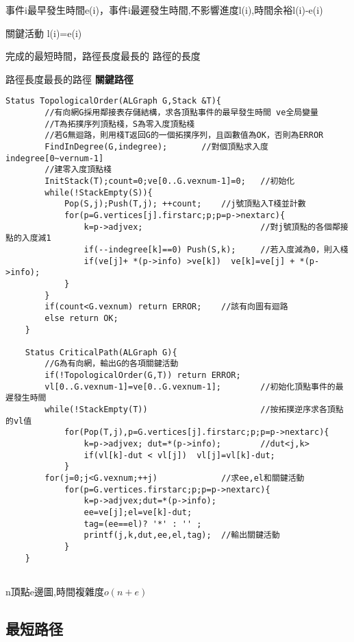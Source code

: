 \documentclass[UTF8]{ctexart}
\newcommand{\mb}[1]{\textbf{#1}}
\begin{document}
事件i最早發生時間e(i)，事件i最遲發生時間,不影響進度l(i),時間余裕l(i)-e(i) 

關鍵活動 l(i)=e(i)


完成的最短時間，路徑長度最長的 路徑的長度

路徑長度最長的路徑 \mb{關鍵路徑}

\begin{lstlisting}[style=v1]
    Status TopologicalOrder(ALGraph G,Stack &T){
        //有向網G採用鄰接表存儲結構，求各頂點事件的最早發生時間 ve全局變量
        //T為拓撲序列頂點棧，S為零入度頂點棧
        //若G無迴路，則用棧T返回G的一個拓撲序列，且函數值為OK，否則為ERROR
        FindInDegree(G,indegree);       //對個頂點求入度indegree[0~vernum-1]
        //建零入度頂點棧
        InitStack(T);count=0;ve[0..G.vexnum-1]=0;   //初始化
        while(!StackEmpty(S)){
            Pop(S,j);Push(T,j); ++count;    //j號頂點入T棧並計數
            for(p=G.vertices[j].firstarc;p;p=p->nextarc){
                k=p->adjvex;                        //對j號頂點的各個鄰接點的入度減1
                if(--indegree[k]==0) Push(S,k);     //若入度減為0，則入棧
                if(ve[j]+ *(p->info) >ve[k])  ve[k]=ve[j] + *(p->info);  
            }
        }
        if(count<G.vexnum) return ERROR;    //該有向圖有迴路
        else return OK;
    }

    Status CriticalPath(ALGraph G){
        //G為有向網，輸出G的各項關鍵活動
        if(!TopologicalOrder(G,T)) return ERROR;
        vl[0..G.vexnum-1]=ve[0..G.vexnum-1];        //初始化頂點事件的最遲發生時間
        while(!StackEmpty(T))                       //按拓撲逆序求各頂點的vl值
            for(Pop(T,j),p=G.vertices[j].firstarc;p;p=p->nextarc){
                k=p->adjvex; dut=*(p->info);        //dut<j,k>
                if(vl[k]-dut < vl[j])  vl[j]=vl[k]-dut;
            }
        for(j=0;j<G.vexnum;++j)             //求ee,el和關鍵活動
            for(p=G.vertices.firstarc;p;p=p->nextarc){
                k=p->adjvex;dut=*(p->info);
                ee=ve[j];el=ve[k]-dut;
                tag=(ee==el)? '*' : '' ;
                printf(j,k,dut,ee,el,tag);  //輸出關鍵活動
            }
    }
 
\end{lstlisting}


n頂點e邊圖,時間複雜度$o(n+e)$

 


\subsection{最短路径}
\end{document}
